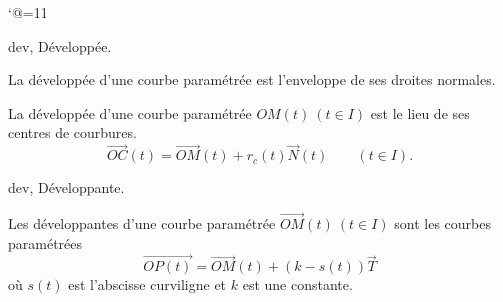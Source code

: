 \catcode`@=11\relax



\vglue-10mm
\bigskip




\Chapter dev, Développée. 

\Theoreme La développée d'une courbe paramétrée est l'enveloppe 
de ses droites normales. 

\Theoreme La développée d'une courbe paramétrée $OM(t)\ (t\in I)$ est le lieu de ses centres de courbures. 
$$
\vec{OC}(t)=\vec{OM}(t)+r_c(t)\vec N(t)\qquad(t\in I). 
$$



\Chapter dev, Développante. 
\bigskip

Les développantes d'une courbe paramétrée $\vec{OM}(t)\ (t\in I)$ sont les courbes paramétrées
$$
\vec {OP(t)}=\vec{OM}(t)+(k-s(t))\vec T
$$ 
où $s(t)$ est l'abscisse curviligne et $k$ est une constante. 



\bye
